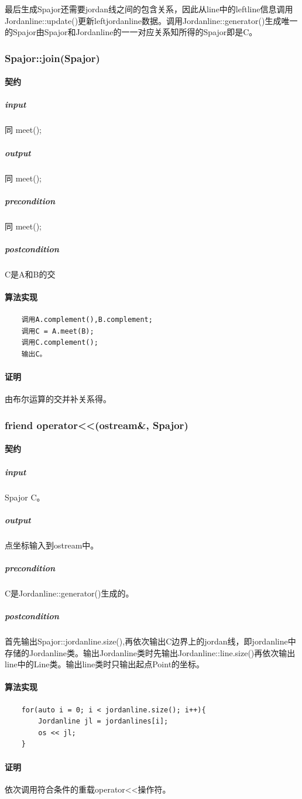 \documentclass[a4paper]{book}
\numberwithin{equation}{chapter}
\theoremstyle{definition}
\begin{document}
	最后生成Spajor还需要jordan线之间的包含关系，因此从line中的leftline信息调用Jordanline::update()更新leftjordanline数据。调用Jordanline::generator()生成唯一的Spajor由Spajor和Jordanline的一一对应关系知所得的Spajor即是C。
	
\subsubsection{Spajor::join(Spajor)}
\paragraph{契约}
\subparagraph{input}
同 meet();
\subparagraph{output}
同 meet();
\subparagraph{precondition}
同 meet();
\subparagraph{postcondition}
C是A和B的交
\paragraph{算法实现}
\begin{lstlisting}
	调用A.complement(),B.complement;
	调用C = A.meet(B);
	调用C.complement();
	输出C。
\end{lstlisting}
\paragraph{证明}
	由布尔运算的交并补关系得。
	
\subsubsection{friend operator<<(ostream\&, Spajor)}
\paragraph{契约}
\subparagraph{input}
Spajor C。
\subparagraph{output}
点坐标输入到ostream中。
\subparagraph{precondition}
C是Jordanline::generator()生成的。
\subparagraph{postcondition}
首先输出Spajor::jordanline.size(),再依次输出C边界上的jordan线，即jordanline中存储的Jordanline类。输出Jordanline类时先输出Jordanline::line.size()再依次输出line中的Line类。输出line类时只输出起点Point的坐标。
\paragraph{算法实现}
\begin{lstlisting}
	for(auto i = 0; i < jordanline.size(); i++){
		Jordanline jl = jordanlines[i];
		os << jl;
	}
\end{lstlisting}
\paragraph{证明}
依次调用符合条件的重载operator<<操作符。
\end{document}
